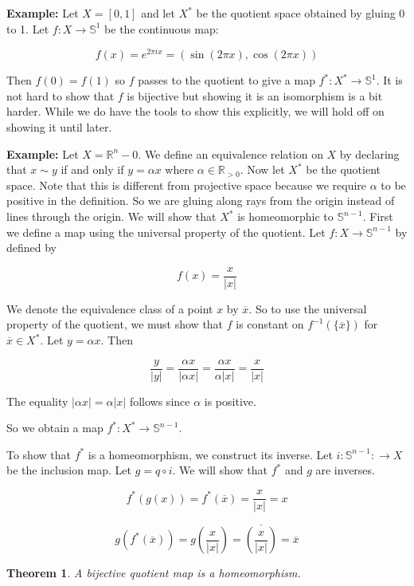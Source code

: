 \documentclass[a4paper]{article}
\newtheorem{theorem}{Theorem}
\numberwithin{theorem}{section}
\begin{document}
\textbf{Example:} Let $X = [0,1]$ and let $X^*$ be the quotient space obtained by gluing 0 to 1. Let $f: X \rightarrow \mathbb{S}^1$ be the continuous map:

$$ f(x) = e^{2 \pi i x} = (\sin (2\pi x),\cos(2 \pi x)) $$

Then $f(0) = f(1)$ so $f$ passes to the quotient to give a map $f^*: X^* \rightarrow \mathbb{S}^1$. It is not hard to show that $f$ is bijective but showing it is an isomorphism is a bit harder. While we do have the tools to show this explicitly, we will hold off on showing it until later.

\textbf{Example:} Let $X = \mathbb{R}^n - 0$. We define an equivalence relation on $X$ by declaring that $x \sim y$ if and only if $y = \alpha x$ where $\alpha \in \mathbb{R}_{> 0}$. Now let $X^*$ be the quotient space. Note that this is different from projective space because we require $\alpha$ to be positive in the definition. So we are gluing along rays from the origin instead of lines through the origin. We will show that $X^*$ is homeomorphic to $\mathbb{S}^{n-1}$. First we define a map using the universal property of the quotient. Let $f: X \rightarrow \mathbb{S}^{n-1}$ by defined by

$$ f(x) = \frac{x}{|x|} $$

We denote the equivalence class of a point $x$ by $\overline{x}$. So to use the universal property of the quotient, we must show that $f$ is constant on $f^{-1}(\{\overline{x}\})$ for $\overline{x} \in X^*$. Let $y = \alpha x$. Then 

$$ \frac{y}{|y|} = \frac{\alpha x}{|\alpha x|} = \frac{\alpha x}{\alpha |x|} = \frac{x}{|x|} $$

The equality $|\alpha x| = \alpha |x|$ follows since $\alpha$ is positive.

So we obtain a map $f^*: X^* \rightarrow \mathbb{S}^{n-1}$.

To show that $f^*$ is a homeomorphism, we construct its inverse. Let $i: \mathbb{S}^{n-1}: \rightarrow X$ be the inclusion map. Let $g = q \circ i$. We will show that $f^*$ and $g$ are inverses.

$$f^*(g(x)) = f^*(\overline{x}) = \frac{x}{|x|} = x $$

$$ g(f^*(\overline{x})) = g\left( \frac{x}{|x|}\right) = \overline{\left( \frac{x}{|x|}\right) } = \overline{x}$$

\begin{theorem}
A bijective quotient map is a homeomorphism.
\end{theorem}
\end{document}
